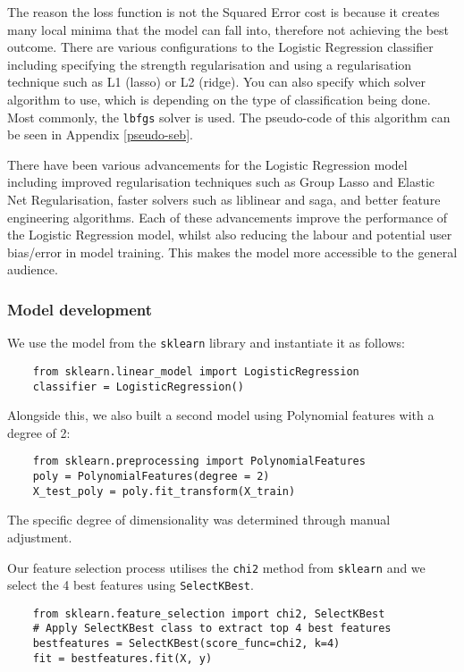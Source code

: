 \documentclass[10pt]{article}
\begin{document}
The reason the loss function is not the Squared Error cost is because it creates many local minima that the model can fall into, therefore not achieving the best outcome. There are various configurations to the Logistic Regression classifier including specifying the strength regularisation and using a regularisation technique such as L1 (lasso) or L2 (ridge). You can also specify which solver algorithm to use, which is depending on the type of classification being done. Most commonly, the \texttt{lbfgs} solver is used. The pseudo-code of this algorithm can be seen in Appendix \ref{pseudo-seb}.

There have been various advancements for the Logistic Regression model including improved regularisation techniques such as Group Lasso and Elastic Net Regularisation, faster solvers such as liblinear and saga, and better feature engineering algorithms. Each of these advancements improve the performance of the Logistic Regression model, whilst also reducing the labour and potential user bias/error in model training. This makes the model more accessible to the general audience.

\subsubsection{Model development}
We use the model from the \texttt{sklearn} library and instantiate it as follows:
\begin{verbatim}
    from sklearn.linear_model import LogisticRegression
    classifier = LogisticRegression()
\end{verbatim}

Alongside this, we also built a second model using Polynomial features with a degree of 2:
\begin{verbatim}
    from sklearn.preprocessing import PolynomialFeatures
    poly = PolynomialFeatures(degree = 2)
    X_test_poly = poly.fit_transform(X_train)
\end{verbatim}
The specific degree of dimensionality was determined through manual adjustment.

\noindent Our feature selection process utilises the \texttt{chi2} method from \texttt{sklearn} and we select the 4 best features using \texttt{SelectKBest}.
\begin{verbatim}
    from sklearn.feature_selection import chi2, SelectKBest
    # Apply SelectKBest class to extract top 4 best features
    bestfeatures = SelectKBest(score_func=chi2, k=4)
    fit = bestfeatures.fit(X, y)
\end{verbatim}
\end{document}

